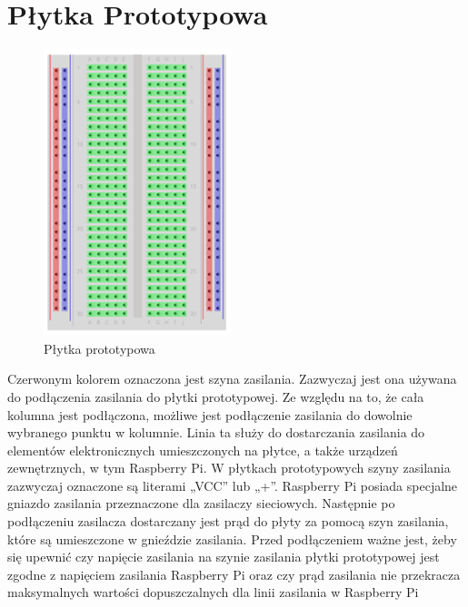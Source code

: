 \section{Płytka Prototypowa}
\begin{figure}
	\centering
	\includegraphics[width=0.7\linewidth]{"obrazy/Breadboard"}
	\caption{Płytka prototypowa}
	\label{fig:3}
\end{figure}
Czerwonym kolorem oznaczona jest szyna zasilania. Zazwyczaj jest ona używana do podłączenia zasilania do płytki prototypowej. Ze względu na to, że cała kolumna jest podłączona, możliwe jest podłączenie zasilania do dowolnie wybranego punktu w kolumnie. Linia ta służy do dostarczania zasilania do elementów elektronicznych umieszczonych na płytce, a także urządzeń zewnętrznych, w tym Raspberry Pi. W płytkach prototypowych szyny zasilania zazwyczaj oznaczone są literami „VCC” lub „+”. Raspberry Pi posiada specjalne gniazdo zasilania przeznaczone dla zasilaczy sieciowych. Następnie po podłączeniu zasilacza dostarczany jest prąd do płyty za pomocą szyn zasilania, które są umieszczone w gnieździe zasilania. Przed podłączeniem ważne jest, żeby się upewnić czy napięcie zasilania na szynie zasilania płytki prototypowej jest zgodne z napięciem zasilania Raspberry Pi oraz czy prąd zasilania nie przekracza maksymalnych wartości dopuszczalnych dla linii zasilania w Raspberry Pi

